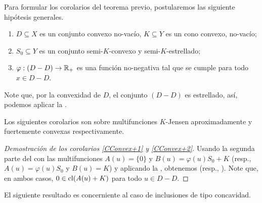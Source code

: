 Para formular los corolarios del teorema previo, postularemos las siguiente
hip\'otesis generales.
\begin{enumerate}[(H1)]
\item $D\subseteq X$ es un conjunto convexo no-vac\'io, 
 $K\subseteq Y$ es un cono convexo, no-vac\'io;
\item $S_0\subseteq Y$ es un conjunto semi-$K$-convexo y semi-$K$-estrellado;
\item $\varphi:(D-D)\to\mathbb{R}_+$ es una funci\'on no-negativa tal que   
se cumple para todo $x\in D-D$. 
\end{enumerate}
Note que, por la convexidad de $D$, el conjunto $(D-D)$ es estrellado,
as\'i, podemos aplicar la . 

Los siguientes corolarios son sobre multifunciones $K$-Jensen aproximadamente y fuertemente convexas
respectivamente.



\begin{proof}[Demostraci\'on de los corolarios \ref{CConvex+1} y \ref{CConvex+2}]
	Usando la segunda parte del  con las multifunciones 
	$A(u) = \{0\}$ y $B(u)=\varphi(u)S_0+K$ (resp., $A(u)=\varphi(u)S_0$ y $B(u)=K$)
	y aplicando la , obtenemos   (resp., ).
	Note que, en ambos casos, $0\in\mathop{\hbox{\rm cl}}\nolimits(A(u)+K)$ para todo $u\in D-D$.
\end{proof}

El siguiente resultado es concerniente al caso de inclusiones de tipo concavidad.

